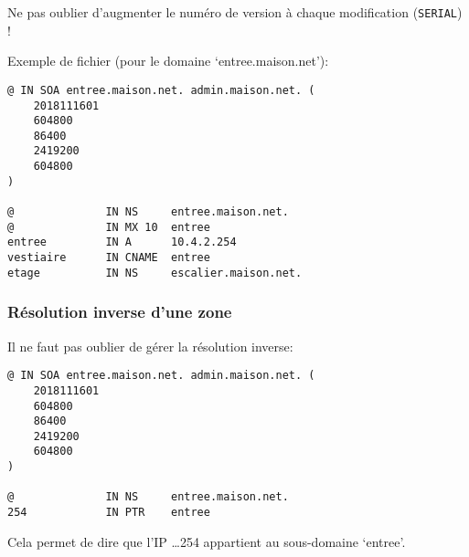 \documentclass[10pt,a4paper,french]{article}
\begin{document}
Ne pas oublier d'augmenter le numéro de version à chaque modification ({\tt SERIAL}) !

Exemple de fichier (pour le domaine `entree.maison.net'):
\begin{verbatim}
@ IN SOA entree.maison.net. admin.maison.net. (
    2018111601
    604800
    86400
    2419200
    604800
)

@              IN NS     entree.maison.net.
@              IN MX 10  entree
entree         IN A      10.4.2.254
vestiaire      IN CNAME  entree
etage          IN NS     escalier.maison.net.
\end{verbatim}

\subsubsection{Résolution inverse d'une zone}

Il ne faut pas oublier de gérer la résolution inverse:
\begin{verbatim}
@ IN SOA entree.maison.net. admin.maison.net. (
    2018111601
    604800
    86400
    2419200
    604800
)

@              IN NS     entree.maison.net.
254            IN PTR    entree
\end{verbatim}
Cela permet de dire que l'IP \ldots 254 appartient au sous-domaine `entree'.
\end{document}
